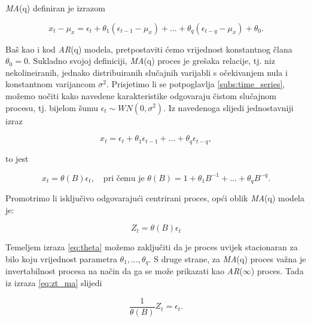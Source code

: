 \documentclass[a4paper,12pt,oneside]{memoir}
\begin{document}
            \textit{MA}(q) definiran je izrazom

            \begin{equation}
                x_t-\mu_x=\epsilon_t+\theta_1(\epsilon_{t-1}-\mu_x)+\ldots+\theta_q(\epsilon_{t-q}-\mu_x)+\theta_0.
            \end{equation}

            Baš kao i kod \textit{AR}(q) modela, pretpostaviti ćemo vrijednost konstantnog člana $\theta_0=0$. Sukladno svojoj definiciji, \textit{MA}(q) proces je grešaka relacije, tj. niz nekolineiranih, jednako distribuiranih slučajnih varijabli s očekivanjem nula i konstantnom varijancom $\sigma^2$. Prisjetimo li se potpoglavlja \ref{subs:time_series}, možemo uočiti kako navedene karakteristike odgovaraju čistom slučajnom procesu, tj. bijelom šumu $\epsilon_t\sim WN(0,\sigma^2)$. Iz navedenoga slijedi jednostavniji izraz

            \begin{equation}
                x_t=\epsilon_t+\theta_1\epsilon_{t-1}+\ldots+\theta_q\epsilon_{t-q},
            \end{equation}

            to jest

            \begin{equation}
                x_t=\theta(B)\epsilon_t, \quad \text{pri čemu je } \theta(B)=1+\theta_1B^{-1}+\ldots+\theta_qB^{-q}.
                \label{eq:theta}
            \end{equation}

            Promotrimo li isključivo odgovarajući centrirani proces, opći oblik \textit{MA}(q) modela je:

            \begin{equation}
                Z_t=\theta(B)\epsilon_t
                \label{eq:zt_ma}
            \end{equation}

            Temeljem izraza \eqref{eq:theta} možemo zaključiti da je proces uvijek stacionaran za bilo koju vrijednost parametra $\theta_1,\ldots,\theta_q$. S druge strane, za \textit{MA}(q) proces važna je invertabilnost procesa na način da ga se može prikazati kao \textit{AR}($\infty$) proces. Tada iz izraza \eqref{eq:zt_ma} slijedi

            \begin{equation}
                \frac{1}{\theta(B)}Z_t=\epsilon_t.
            \end{equation}
\end{document}
